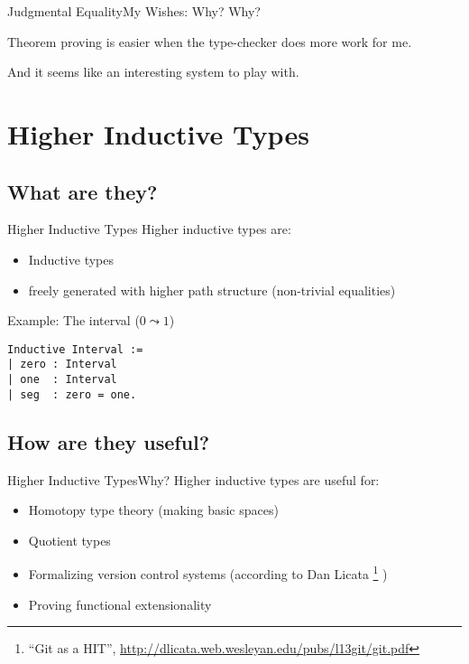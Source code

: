 \documentclass{beamer}
\begin{document}
\begin{frame}{Judgmental Equality}{My Wishes: Why?}
  \Large
  Why? \pause
  
  Theorem proving is easier when the type-checker does more work for me. \pause
  
  And it seems like an interesting system to play with.
\end{frame}

\section{Higher Inductive Types}
\subsection{What are they?}

\begin{frame}[fragile]{Higher Inductive Types}
  \Large
  Higher inductive types are: \pause
  \begin{itemize}
    \item Inductive types \pause
    \item freely generated with higher path structure (non-trivial equalities) \pause
  \end{itemize}
  Example: The interval ($0 \leadsto 1$) \pause
\begin{verbatim}
Inductive Interval :=
| zero : Interval
| one  : Interval
| seg  : zero = one. 
\end{verbatim}
\end{frame}

\subsection{How are they useful?}

\begin{frame}[fragile]{Higher Inductive Types}{Why?}
  \Large
  Higher inductive types are useful for: \pause
  \begin{itemize}
    \item Homotopy type theory (making basic spaces)\pause
    \item Quotient types \pause
    \item Formalizing version control systems (according to Dan Licata%
    \footnote<4->{``Git as a HIT'', \url{http://dlicata.web.wesleyan.edu/pubs/l13git/git.pdf}}%
    ) \pause
    \item Proving functional extensionality
  \end{itemize}
\end{frame}
\end{document}
